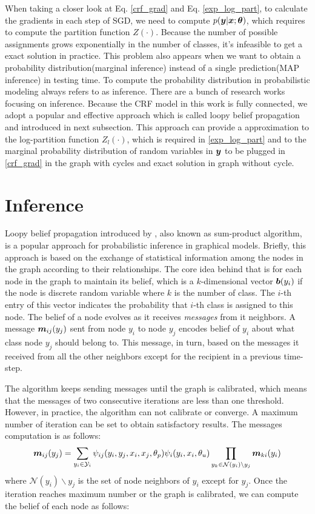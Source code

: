 When taking a closer look at Eq. \ref{crf_grad} and Eq. \ref{exp_log_part}, to calculate the gradients in each step of SGD, we need to compute $p(\boldsymbol y|\boldsymbol x; \boldsymbol \theta)$, which requires to compute the partition function $Z(\cdot)$. Because the number of possible assignments grows exponentially in the number of classes, it's infeasible to get a exact solution in practice. This problem also appears when we want to obtain a probability distribution(marginal inference) instead of a single prediction(MAP inference) in testing time. To compute the probability distribution in probabilistic modeling always refers to as inference. There are a bunch of research works focusing on inference. Because the CRF model in this work is fully connected, we adopt a popular and effective approach which is called loopy belief propagation and introduced in next subsection. This approach can provide a approximation to the log-partition function $Z_l(\cdot)$, which is required in \ref{exp_log_part} and to the marginal probability distribution of random variables in $\boldsymbol y$ to be plugged in \ref{crf_grad} in the graph with cycles and exact solution in graph without cycle.


\section{Inference}
Loopy belief propagation introduced by \cite{pearl2014probabilistic}, also known as sum-product algorithm, is a popular approach for probabilistic inference in graphical models. Briefly, this approach is based on the exchange of statistical information among the nodes in the graph according to their relationships. The core idea behind that is for each node in the graph to maintain its belief, which is a $k$-dimensional vector $\boldsymbol b(y_i)$ if the node is discrete random variable where $k$ is the number of class. The $i$-th entry of this vector indicates the probability that $i$-th class is assigned to this node. The belief of a node evolves as it receives \textit{messages} from it neighbors. A message $\boldsymbol m_{ij}(y_j)$ sent from node $y_i$ to node $y_j$ encodes belief of $y_i$ about what class node $y_j$ should belong to. This message, in turn, based on the messages it received from all the other neighbors except for the recipient in a previous time-step.

The algorithm keeps sending messages until the graph is calibrated, which means that the messages of two consecutive iterations are less than one threshold. However, in practice, the algorithm can not calibrate or converge. A maximum number of iteration can be set to obtain satisfactory results. The messages computation is as follows:
\begin{equation}
\label{message}
\boldsymbol m_{ij}(y_j) = \sum_{y_i\in \mathcal{Y}_i}\psi_{ij}(y_i, y_j, x_i, x_j, \theta_p)\psi_i(y_i, x_i, \theta_u) \prod_{y_k\in\mathcal{N}(y_i)\backslash y_j}\boldsymbol m_{ki}(y_i)
\end{equation}
where $\mathcal{N}(y_i) \backslash y_j$ is the set of node neighbors of $y_i$ except for $y_j$. Once the iteration reaches maximum number or the graph is calibrated, we can compute the belief of each node as follows:

